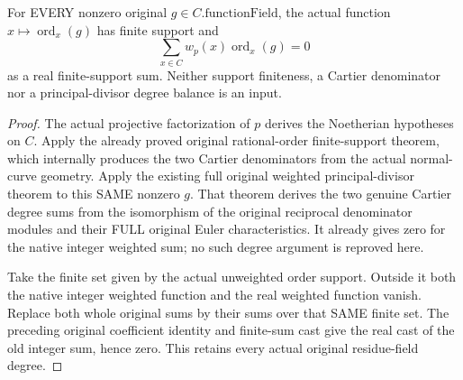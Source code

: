 \begin{theorem}
\label{thm:gauss-common-leading-real-principal-balance}
\leanok
For EVERY nonzero original $g\in C.\mathrm{functionField}$, the actual
function $x\mapsto\operatorname{ord}_x(g)$ has finite support and
\[
 \sum_{x\in C}w_p(x)\operatorname{ord}_x(g)=0
\]
as a real finite-support sum. Neither support finiteness, a Cartier
denominator nor a principal-divisor degree balance is an input.
\end{theorem}
\begin{proof}
The actual projective factorization of $p$ derives the Noetherian
hypotheses on $C$. Apply the already proved original rational-order
finite-support theorem, which internally produces the two Cartier
denominators from the actual normal-curve geometry.
Apply the existing full original weighted principal-divisor theorem to
this SAME nonzero $g$. That theorem derives the two genuine Cartier
degree sums from the isomorphism of the original reciprocal denominator
modules and their FULL original Euler characteristics. It already gives
zero for the native integer weighted sum; no such degree argument is
reproved here.

Take the finite set given by the actual unweighted order support. Outside
it both the native integer weighted function and the real weighted
function vanish. Replace both whole original sums by their sums over
that SAME finite set. The preceding original coefficient identity and
finite-sum cast give the real cast of the old integer sum, hence zero.
This retains every actual original residue-field degree.
\end{proof}


